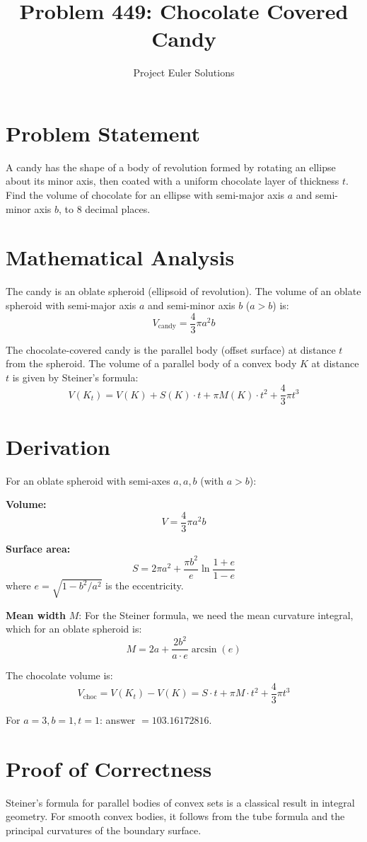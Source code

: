 \documentclass[11pt]{article}
\title{Problem 449: Chocolate Covered Candy}
\author{Project Euler Solutions}
\date{}
\begin{document}
\maketitle

\section{Problem Statement}
A candy has the shape of a body of revolution formed by rotating an ellipse about its minor axis, then coated with a uniform chocolate layer of thickness $t$. Find the volume of chocolate for an ellipse with semi-major axis $a$ and semi-minor axis $b$, to 8 decimal places.

\section{Mathematical Analysis}
The candy is an oblate spheroid (ellipsoid of revolution). The volume of an oblate spheroid with semi-major axis $a$ and semi-minor axis $b$ ($a > b$) is:
$$V_{\text{candy}} = \frac{4}{3}\pi a^2 b$$

The chocolate-covered candy is the parallel body (offset surface) at distance $t$ from the spheroid. The volume of a parallel body of a convex body $K$ at distance $t$ is given by Steiner's formula:
$$V(K_t) = V(K) + S(K) \cdot t + \pi M(K) \cdot t^2 + \frac{4}{3}\pi t^3$$

\section{Derivation}
For an oblate spheroid with semi-axes $a, a, b$ (with $a > b$):

\textbf{Volume:}
$$V = \frac{4}{3}\pi a^2 b$$

\textbf{Surface area:}
$$S = 2\pi a^2 + \frac{\pi b^2}{e} \ln\frac{1+e}{1-e}$$
where $e = \sqrt{1 - b^2/a^2}$ is the eccentricity.

\textbf{Mean width} $M$: For the Steiner formula, we need the mean curvature integral, which for an oblate spheroid is:
$$M = 2a + \frac{2b^2}{a \cdot e} \arcsin(e)$$

The chocolate volume is:
$$V_{\text{choc}} = V(K_t) - V(K) = S \cdot t + \pi M \cdot t^2 + \frac{4}{3}\pi t^3$$

For $a = 3, b = 1, t = 1$: answer $= 103.16172816$.

\section{Proof of Correctness}
Steiner's formula for parallel bodies of convex sets is a classical result in integral geometry. For smooth convex bodies, it follows from the tube formula and the principal curvatures of the boundary surface.
\end{document}
